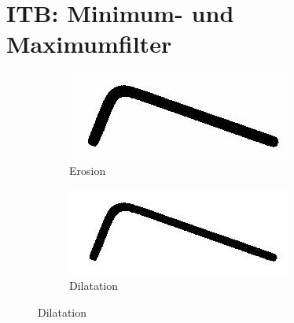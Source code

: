 \section{ITB: Minimum- und Maximumfilter}
\begin{figure}
	\centering
	\begin{subfigure}{.49\textwidth}
		\centering
		\includegraphics[width=.99\linewidth]{A2/allen_key_test_erosion.jpg}
		\caption{Erosion}
	\end{subfigure}
	\begin{subfigure}{.49\textwidth}
		\centering
		\includegraphics[width=.99\linewidth]{A2/allen_key_test_dilatation.jpg}
		\caption{Dilatation}
	\end{subfigure}
\end{figure}